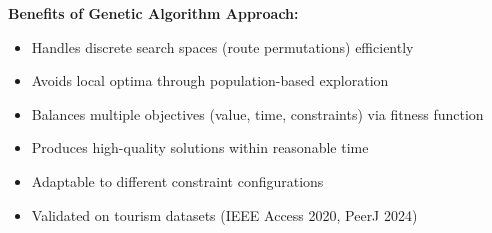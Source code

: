 \textbf{Benefits of Genetic Algorithm Approach:}
\begin{itemize}
\item Handles discrete search spaces (route permutations) efficiently
\item Avoids local optima through population-based exploration
\item Balances multiple objectives (value, time, constraints) via fitness function
\item Produces high-quality solutions within reasonable time
\item Adaptable to different constraint configurations
\item Validated on tourism datasets (IEEE Access 2020, PeerJ 2024)
\end{itemize}
